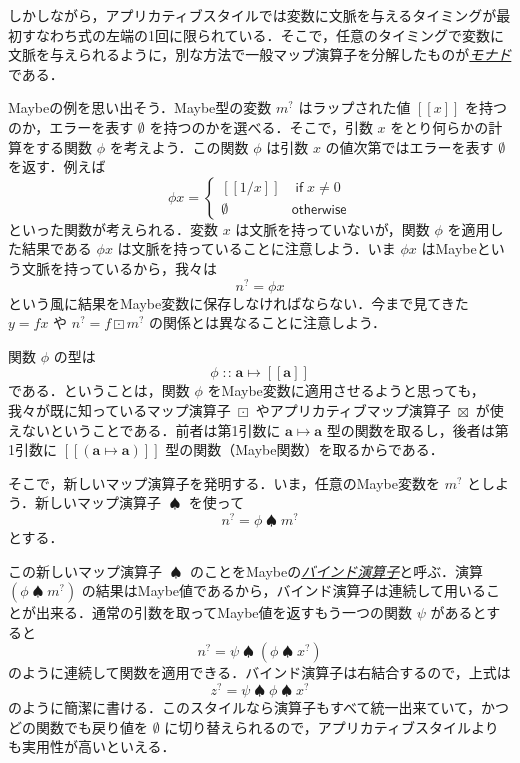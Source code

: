 \documentclass[a4paper]{jsbook}
\def\[{\left[\!\left[}
\def\]{\right]\!\right]}
\newcommand{\keyword}[1]{{\underline{\emph{#1}}}}
\newcommand{\mType}[1]{\mathbf{#1}}
\newcommand{\mMaybeType}[1]{\[\mType{#1}\]}
\newcommand{\mNothing}{\emptyset}
\newcommand{\mKeyword}[1]{\mathsf{#1}}
\newcommand{\mOtherwiseKeyword}{\mKeyword{otherwise}}
\newcommand{\mMaybeWith}[1]{\[#1\]}
\newcommand{\mMaybe}[1]{{#1}^\text{?}}
\DeclareMathOperator{\mIn}{{:\!:}}
\DeclareMathOperator{\mMapsTo}{\mapsto}
\DeclareMathOperator{\mMapMaybe}{\boxdot}
\DeclareMathOperator{\mApplicativeMapMaybe}{\boxtimes}
\DeclareMathOperator{\mBindMaybe}{\spadesuit}%
\DeclareMathOperator{\mOtherwise}{\mOtherwiseKeyword}
\newcommand{\mProjection}[2]{#1\mMapsTo#2}
\newcommand{\mathKeyword}[1]{\operatorname{\textsf{#1}}}
\newcommand{\mathIf}{\mathKeyword{if}}
\begin{document}
しかしながら，アプリカティブスタイルでは変数に文脈を与えるタイミングが最初すなわち式の左端の1回に限られている．そこで，任意のタイミングで変数に文脈を与えられるように，別な方法で一般マップ演算子を分解したものが\keyword{モナド}である．

Maybeの例を思い出そう．Maybe型の変数 $\mMaybe{m}$ はラップされた値 $\mMaybeWith{x}$ を持つのか，エラーを表す $\mNothing$ を持つのかを選べる．そこで，引数 $x$ をとり何らかの計算をする関数 $\phi$ を考えよう．この関数 $\phi$ は引数 $x$ の値次第ではエラーを表す $\mNothing$ を返す．例えば
\begin{equation}
\phi x=\begin{cases}
\mMaybeWith{1/x}&\mathIf x\neq0\\
\mNothing&\mOtherwise
\end{cases}
\end{equation}
といった関数が考えられる．変数 $x$ は文脈を持っていないが，関数 $\phi$ を適用した結果である $\phi x$ は文脈を持っていることに注意しよう．いま $\phi x$ はMaybeという文脈を持っているから，我々は
\begin{equation}
\mMaybe{n}=\phi x
\end{equation}
という風に結果をMaybe変数に保存しなければならない．今まで見てきた $y=fx$ や $\mMaybe{n}=f\mMapMaybe\mMaybe{m}$ の関係とは異なることに注意しよう．

関数 $\phi$ の型は
\begin{equation}
\phi\mIn\mProjection{\mType{a}}{\mMaybeType{a}}
\end{equation}
である．ということは，関数 $\phi$ をMaybe変数に適用させるようと思っても，我々が既に知っているマップ演算子 $\mMapMaybe$ やアプリカティブマップ演算子 $\mApplicativeMapMaybe$ が使えないということである．前者は第1引数に $\mProjection{\mType{a}}{\mType{a}}$ 型の関数を取るし，後者は第1引数に $\mMaybeWith{(\mProjection{\mType{a}}{\mType{a}})}$ 型の関数（Maybe関数）を取るからである． %

そこで，新しいマップ演算子を発明する．いま，任意のMaybe変数を $\mMaybe{m}$ としよう．新しいマップ演算子 $\mBindMaybe$ を使って
\begin{equation}
\mMaybe{n}=\phi\mBindMaybe\mMaybe{m}
\end{equation}
とする．

この新しいマップ演算子 $\mBindMaybe$ のことをMaybeの\keyword{バインド演算子}と呼ぶ．演算 $(\phi\mBindMaybe\mMaybe{m})$ の結果はMaybe値であるから，バインド演算子は連続して用いることが出来る．通常の引数を取ってMaybe値を返すもう一つの関数 $\psi$ があるとすると
\begin{equation}
\mMaybe{n}=\psi\mBindMaybe{}(\phi\mBindMaybe\mMaybe{x})
\end{equation}
のように連続して関数を適用できる．バインド演算子は右結合するので，上式は
\begin{equation}
\label{eq:maybe-z-bind-style}
\mMaybe{z}=\psi\mBindMaybe\phi\mBindMaybe\mMaybe{x}
\end{equation}
のように簡潔に書ける．このスタイルなら演算子もすべて統一出来ていて，かつどの関数でも戻り値を $\mNothing$ に切り替えられるので，アプリカティブスタイルよりも実用性が高いといえる．
\end{document}
